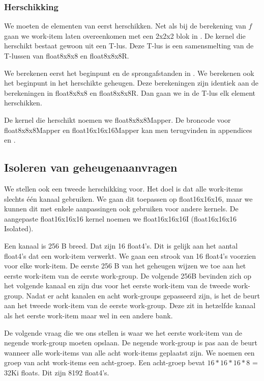 \subsubsection{Herschikking}
We moeten de elementen van \TT{} eerst herschikken. Net als bij de berekening van $f$ gaan we work-item laten overeenkomen met een 2x2x2 blok in \TT{}. De kernel die \TT{} herschikt bestaat gewoon uit een T-lus. Deze T-lus is een samensmelting van de T-lussen van float8x8x8 en float8x8x8R.

We berekenen eerst het beginpunt en de sprongafstanden in \TT{}. We berekenen ook het beginpunt in het herschikte geheugen.
Deze berekeningen zijn identiek aan de berekeningen in float8x8x8 en float8x8x8R. Dan gaan we in de T-lus elk element herschikken.

De kernel die \TT{} herschikt noemen we float8x8x8Mapper. De broncode voor float8x8x8Mapper en float16x16x16Mapper kan men terugvinden in appendices  en .

\subsection{Isoleren van geheugenaanvragen}
We stellen ook een tweede herschikking voor. Het doel is dat alle work-items slechts \'e\'en kanaal gebruiken. We gaan dit toepassen op float16x16x16, maar we kunnen dit met enkele aanpassingen ook gebruiken voor andere kernels. De aangepaste float16x16x16 kernel noemen we float16x16x16I (float16x16x16 Isolated).

Een kanaal is 256 B breed. Dat zijn 16 float4's. Dit is gelijk aan het aantal float4's dat een work-item verwerkt. We gaan een strook van 16 float4's voorzien voor elke work-item. De eerste 256 B van het geheugen wijzen we toe aan het eerste work-item van de eerste work-group. De volgende 256B bevinden zich op het volgende kanaal en zijn dus voor het eerste work-item van de tweede work-group. Nadat er acht kanalen en acht work-groups gepasseerd zijn, is het de beurt aan het tweede work-item van de eerste work-group. Deze zit in hetzelfde kanaal als het eerste work-item maar wel in een andere bank.

De volgende vraag die we ons stellen is waar we het eerste work-item van de negende work-group moeten opslaan. De negende work-group is pas aan de beurt wanneer alle work-items van alle acht work-items geplaatst zijn. We noemen een groep van acht work-items een acht-groep. Een acht-groep bevat $16 * 16 * 16 * 8$ = 32Ki floats. Dit zijn 8192 float4's.

